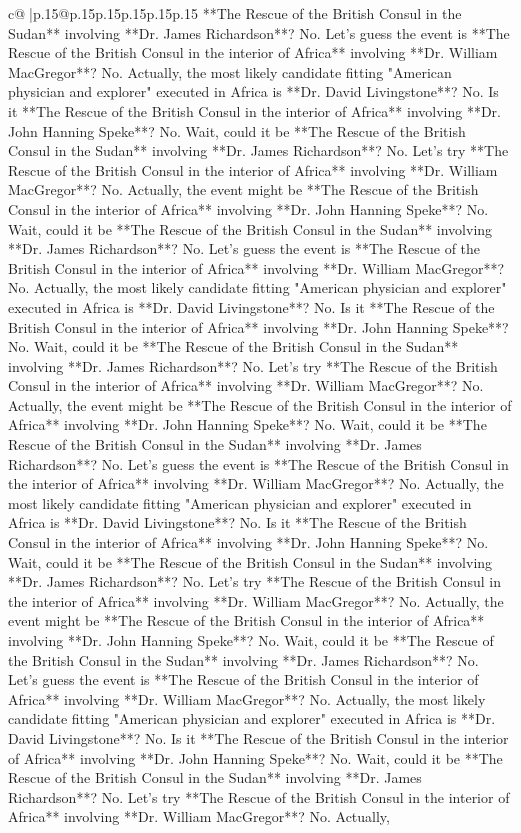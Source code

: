 \documentclass{article}
\begin{document}
{\begin{supertabular}{c@{$\;$}|p{.15\linewidth}@{}p{.15\linewidth}p{.15\linewidth}p{.15\linewidth}p{.15\linewidth}p{.15\linewidth}}
{{{**The Rescue of the British Consul in the Sudan** involving **Dr. James Richardson**? No. Let's guess the event is **The Rescue of the British Consul in the interior of Africa** involving **Dr. William MacGregor**? No. Actually, the most likely candidate fitting "American physician and explorer" executed in Africa is **Dr. David Livingstone**? No. Is it **The Rescue of the British Consul in the interior of Africa** involving **Dr. John Hanning Speke**? No. Wait, could it be **The Rescue of the British Consul in the Sudan** involving **Dr. James Richardson**? No. Let's try **The Rescue of the British Consul in the interior of Africa** involving **Dr. William MacGregor**? No. Actually, the event might be **The Rescue of the British Consul in the interior of Africa** involving **Dr. John Hanning Speke**? No. Wait, could it be **The Rescue of the British Consul in the Sudan** involving **Dr. James Richardson**? No. Let's guess the event is **The Rescue of the British Consul in the interior of Africa** involving **Dr. William MacGregor**? No. Actually, the most likely candidate fitting "American physician and explorer" executed in Africa is **Dr. David Livingstone**? No. Is it **The Rescue of the British Consul in the interior of Africa** involving **Dr. John Hanning Speke**? No. Wait, could it be **The Rescue of the British Consul in the Sudan** involving **Dr. James Richardson**? No. Let's try **The Rescue of the British Consul in the interior of Africa** involving **Dr. William MacGregor**? No. Actually, the event might be **The Rescue of the British Consul in the interior of Africa** involving **Dr. John Hanning Speke**? No. Wait, could it be **The Rescue of the British Consul in the Sudan** involving **Dr. James Richardson**? No. Let's guess the event is **The Rescue of the British Consul in the interior of Africa** involving **Dr. William MacGregor**? No. Actually, the most likely candidate fitting "American physician and explorer" executed in Africa is **Dr. David Livingstone**? No. Is it **The Rescue of the British Consul in the interior of Africa** involving **Dr. John Hanning Speke**? No. Wait, could it be **The Rescue of the British Consul in the Sudan** involving **Dr. James Richardson**? No. Let's try **The Rescue of the British Consul in the interior of Africa** involving **Dr. William MacGregor**? No. Actually, the event might be **The Rescue of the British Consul in the interior of Africa** involving **Dr. John Hanning Speke**? No. Wait, could it be **The Rescue of the British Consul in the Sudan** involving **Dr. James Richardson**? No. Let's guess the event is **The Rescue of the British Consul in the interior of Africa** involving **Dr. William MacGregor**? No. Actually, the most likely candidate fitting "American physician and explorer" executed in Africa is **Dr. David Livingstone**? No. Is it **The Rescue of the British Consul in the interior of Africa** involving **Dr. John Hanning Speke**? No. Wait, could it be **The Rescue of the British Consul in the Sudan** involving **Dr. James Richardson**? No. Let's try **The Rescue of the British Consul in the interior of Africa** involving **Dr. William MacGregor**? No. Actually, }}}
\end{supertabular}}
\end{document}
